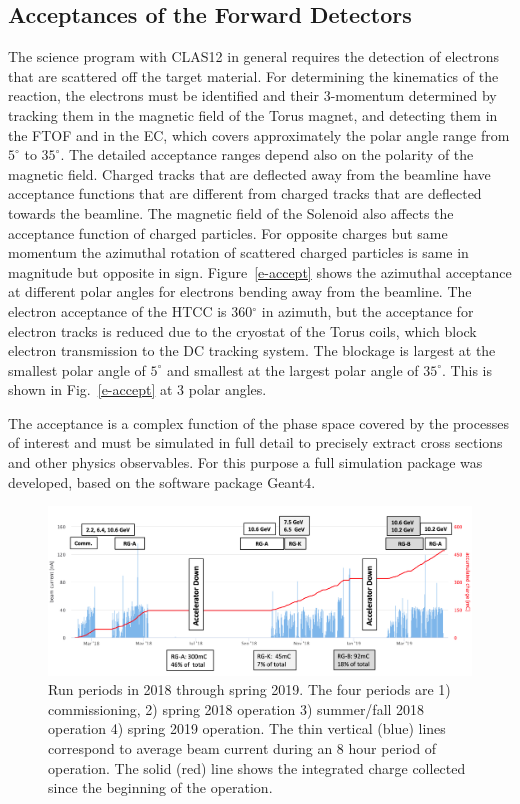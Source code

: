 \documentclass[final,3p,twocolumn]{elsarticle}
\begin{document}
\subsection{Acceptances of the Forward Detectors} 

The science program with CLAS12 in general requires the detection of electrons that are scattered off the target
material. For determining the kinematics of the reaction, the electrons must be identified and their 3-momentum
determined by tracking them in the magnetic field of the Torus magnet, and detecting them in the FTOF and in the
EC, which covers approximately the polar angle range from $5^\circ$ to $35^\circ$. The detailed acceptance ranges
depend also on the polarity of the magnetic field. Charged tracks that are deflected away from the beamline have
acceptance functions that are different from charged tracks that are deflected towards the beamline. The magnetic
field of the Solenoid also affects the acceptance function of charged particles. For opposite charges but same 
momentum the azimuthal rotation of scattered charged particles is same in magnitude but opposite in sign.  
Figure~\ref{e-accept} shows the azimuthal acceptance at different polar angles for electrons bending away from the
beamline. The electron acceptance of the HTCC is 360$^\circ$ in azimuth, but the acceptance for electron tracks is
reduced due to the cryostat of the Torus coils, which block electron transmission to the DC tracking system. The blockage
is largest at the smallest polar angle of $5^\circ$ and smallest at the largest polar angle of  $35^\circ$. This is shown 
in Fig.~\ref{e-accept} at 3 polar angles.  

The acceptance is a complex function of the phase space covered by the processes of interest and must be simulated in 
full detail to precisely extract cross sections and other physics observables.  For this purpose a full simulation package 
was developed, based on the software package Geant4. 

\begin{figure}[htbp!]
\centerline{\includegraphics[width=1.9\columnwidth]{charges-bw.png}}
\caption{Run periods in 2018 through spring 2019. The four periods are 1) commissioning, 2) spring 2018 operation 3) summer/fall 2018 operation 
4) spring 2019 operation. The thin vertical (blue) lines correspond to average beam current during an 8 hour period of operation. The solid (red) line 
shows the integrated charge collected since the beginning of the operation.}
\label{charges}
\end{figure}
\end{document}
